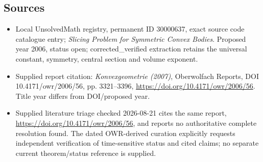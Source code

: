 \documentclass[11pt]{article}
\begin{document}
\subsection{Sources}
\begin{itemize}
\item Local UnsolvedMath registry, permanent ID 30000637, exact source code catalogue entry; \emph{Slicing Problem for Symmetric Convex Bodies}. Proposed year 2006, status open; corrected\_verified extraction retains the universal constant, symmetry, central section and volume exponent.
\item Supplied report citation: \emph{Konvexgeometrie (2007)}, Oberwolfach Reports, DOI 10.4171/owr/2006/56, pp. 3321--3396, \url{https://doi.org/10.4171/owr/2006/56}. Title year differs from DOI/proposed year.
\item Supplied literature triage checked 2026-08-21 cites the same report, \url{https://doi.org/10.4171/owr/2006/56}, and reports no authoritative complete resolution found. The dated OWR-derived curation explicitly requests independent verification of time-sensitive status and cited claims; no separate current theorem/status reference is supplied.
\end{itemize}
\end{document}
